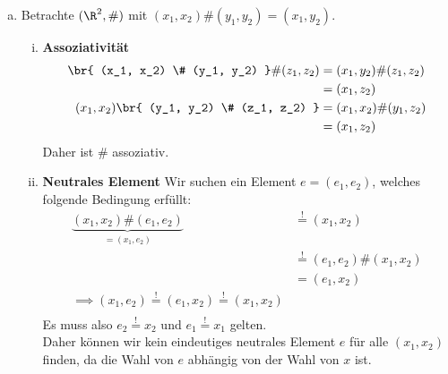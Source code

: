 \begin{enumerate}[a)]
  \item Betrachte $ (\R^2, \#) $ mit $ (x_1, x_2)\# (y_1, y_2) = (x_1, y_2) $.
  \begin{enumerate}[i)]
    \item \textbf{Assoziativität}
      \begin{align*}
        \br{ (x_1, x_2) \# (y_1, y_2) } \# (z_1, z_2) &= (x_1, y_2) \# (z_1, z_2) \\
                                                      &= (x_1, z_2) \\
        (x_1, x_2) \br{ (y_1, y_2) \# (z_1, z_2) } &= (x_1, x_2) \# (y_1, z_2) \\
                                                   &= (x_1, z_2) \\
      \end{align*}
      Daher ist $\#$ assoziativ.
    \item \textbf{Neutrales Element}
      Wir suchen ein Element $e = (e_1, e_2)$, welches folgende Bedingung erfüllt:
      \begin{align*}
        \underbrace{(x_1,x_2)\#(e_1, e_2)}_{=(x_1, e_2)} &\overset{!}{=} (x_1, x_2) \\
                              &\overset{!}{=} (e_1, e_2) \# (x_1, x_2) \\
                              &= (e_1, x_2) \\
                \implies (x_1, e_2) \overset{!}{=} (e_1, x_2) \overset{!}{=} (x_1, x_2) \\
      \end{align*}
      Es muss also $e_2 \overset{!}{=} x_2$ und $e_1 \overset{!}{=} x_1$ gelten. \\
      Daher können wir kein eindeutiges neutrales Element $e$ für alle $(x_1, x_2)$ finden, da die Wahl von $e$ abhängig von der Wahl von $x$ ist.


\end{enumerate}
\end{enumerate}
